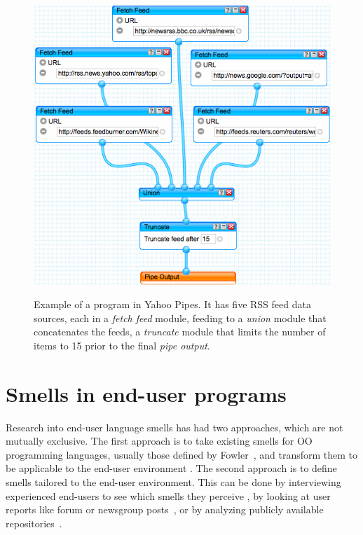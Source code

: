 \documentclass{sig-alternate}
\begin{document}
\begin{figure}[h!tb]
\caption{Example of a program in Yahoo Pipes. It has five RSS feed data sources, each in a \emph{fetch feed} module, feeding to a \emph{union} module that concatenates the feeds, a \emph{truncate} module that limits the number of items to 15 prior to the final \emph{pipe output}. }
\centering
\includegraphics[width=\columnwidth]{img/yp-1}
\label{fig:ypexample}
\end{figure}


\section{Smells in end-user programs}
\label{sec:smells}
Research into end-user language smells has had two approaches, which are not mutually exclusive.
The first approach is to take existing smells for OO programming languages, usually those defined by Fowler~\cite{Fowl1999}, and transform them to be applicable to the end-user environment \cite{Hermans2012inter,Hermans2012intra,Stolee2011,StoleeTSE2013, chambers2013smell}.
The second approach is to define smells tailored to the end-user environment.
This can be done by interviewing experienced end-users to see which smells they perceive \cite{chambers2013smell}, by looking at user reports like forum or newsgroup posts~\cite{badame2012refactoring,chambers2013smell}, or by analyzing publicly available repositories~\cite{Stolee2011,StoleeTSE2013,Hermans2012intra}.
\end{document}
